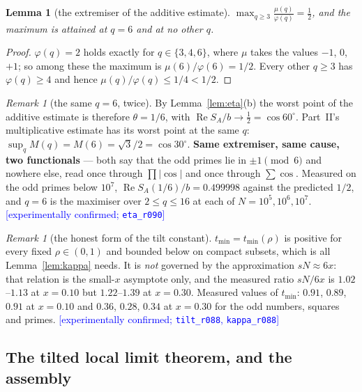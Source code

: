 \documentclass[11pt,a4paper]{article}
\theoremstyle{plain}
\newtheorem{lemma}[theorem]{Lemma}
\theoremstyle{definition}
\theoremstyle{remark}
\newtheorem{remark}[theorem]{Remark}
\newcommand{\STATUS}[1]{\textcolor{blue}{\textsf{[#1]}}}
\begin{document}
\begin{lemma}[the extremiser of the additive estimate]\label{lem:six}
$\displaystyle\max_{q\ge3}\frac{\mu(q)}{\varphi(q)}=\frac12$, and the maximum is attained at
$q=6$ and at no other $q$.
\end{lemma}

\begin{proof}
$\varphi(q)=2$ holds exactly for $q\in\{3,4,6\}$, where $\mu$ takes the values $-1$, $0$, $+1$;
so among these the maximum is $\mu(6)/\varphi(6)=1/2$. Every other $q\ge3$ has $\varphi(q)\ge4$
and hence $\mu(q)/\varphi(q)\le1/4<1/2$.
\end{proof}

\begin{remark}[the same $q=6$, twice]\label{rem:sixagain}
By Lemma~\ref{lem:eta}(b) the worst point of the additive estimate is therefore $\theta=1/6$,
with $\operatorname{Re}S_A/b\to\tfrac12=\cos60^\circ$. Part~II's multiplicative estimate has its
worst point at the same $q$: $\sup_qM(q)=M(6)=\sqrt3/2=\cos30^\circ$. \textbf{Same extremiser,
same cause, two functionals} --- both say that the odd primes lie in $\pm1\pmod6$ and nowhere
else, read once through $\prod|\cos|$ and once through $\sum\cos$. Measured on the odd primes
below $10^{7}$, $\operatorname{Re}S_A(1/6)/b=0.499998$ against the predicted $1/2$, and $q=6$
is the maximiser over $2\le q\le16$ at each of $N=10^{5},10^{6},10^{7}$.
\STATUS{experimentally confirmed; \texttt{eta\_r090}}
\end{remark}

\begin{remark}[the honest form of the tilt constant]\label{rem:kapparho}
$t_{\min}=t_{\min}(\rho)$ is positive for every fixed $\rho\in(0,1)$ and bounded below on
compact subsets, which is all Lemma~\ref{lem:kappa} needs. It is \emph{not} governed by the
approximation $sN\approx6x$: that relation is the small-$x$ asymptote only, and the measured
ratio $sN/6x$ is $1.02$--$1.13$ at $x=0.10$ but $1.22$--$1.39$ at $x=0.30$. Measured values of
$t_{\min}$: $0.91$, $0.89$, $0.91$ at $x=0.10$ and $0.36$, $0.28$, $0.34$ at $x=0.30$ for the
odd numbers, squares and primes.
\STATUS{experimentally confirmed; \texttt{tilt\_r088}, \texttt{kappa\_r088}}
\end{remark}

\subsection{The tilted local limit theorem, and the assembly}\label{sec:p3}
\end{document}
